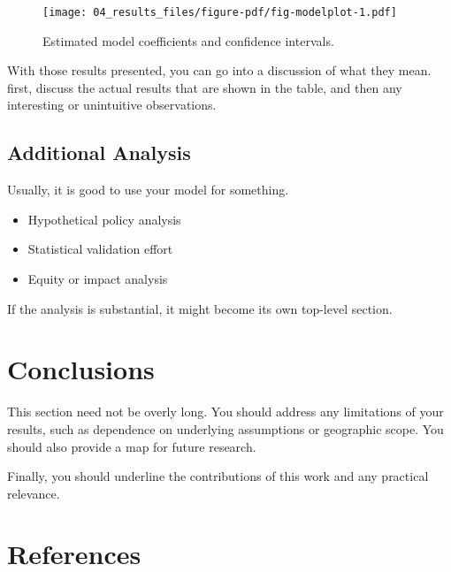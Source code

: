 \documentclass[
  letterpaper,
  authoryear]{elsarticle}
\providecommand{\tightlist}{%
  \setlength{\itemsep}{0pt}\setlength{\parskip}{0pt}}\usepackage{longtable,booktabs,array}
\begin{document}
\begin{figure}

{\centering \texttt{[image: 04\_results\_files/figure-pdf/fig-modelplot-1.pdf]}

}

\caption{\label{fig-modelplot}Estimated model coefficients and
confidence intervals.}

\end{figure}

With those results presented, you can go into a discussion of what they
mean. first, discuss the actual results that are shown in the table, and
then any interesting or unintuitive observations.

\hypertarget{additional-analysis}{%
\subsection{Additional Analysis}\label{additional-analysis}}

Usually, it is good to use your model for something.

\begin{itemize}
\tightlist
\item
  Hypothetical policy analysis
\item
  Statistical validation effort
\item
  Equity or impact analysis
\end{itemize}

If the analysis is substantial, it might become its own top-level
section.


\hypertarget{conclusions}{%
\section{Conclusions}\label{conclusions}}

This section need not be overly long. You should address any limitations
of your results, such as dependence on underlying assumptions or
geographic scope. You should also provide a map for future research.

Finally, you should underline the contributions of this work and any
practical relevance.


\hypertarget{references}{%
\section*{References}\label{references}}


\renewcommand{\bibsection}{}

\end{document}
